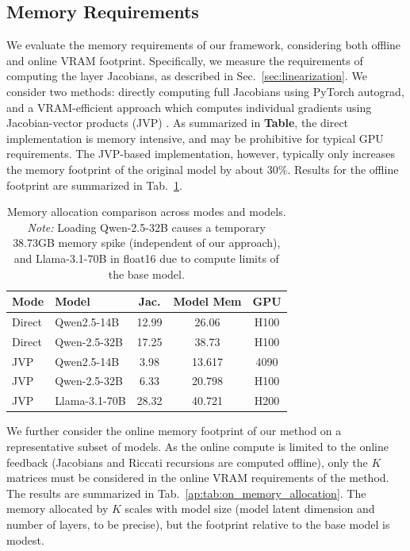 \documentclass{article}
\theoremstyle{plain}
\theoremstyle{definition}
\theoremstyle{remark}
\begin{document}
\FloatBarrier
\subsection{Memory Requirements}\label{ap:memory_reqs}
We evaluate the memory requirements of our framework, considering both offline and online VRAM footprint. Specifically, we measure the requirements of computing the layer Jacobians, as described in Sec.~\ref{sec:linearization}. We consider two methods: directly computing full Jacobians using PyTorch autograd, and a VRAM-efficient approach which computes individual gradients using Jacobian-vector products (JVP) \cite{paszke2019pytorch}. As summarized in \textbf{Table}, the direct implementation is memory intensive, and may be prohibitive for typical GPU requirements. The JVP-based implementation, however, typically only increases the memory footprint of the original model by about 30\%. Results for the offline footprint are summarized in Tab.~\ref{ap:tab:off_memory_allocation}.

\begin{table}[hbp]
\centering
\begin{threeparttable}
\caption{Memory allocation comparison across modes and models. \textit{Note:} Loading Qwen-2.5-32B causes a temporary 38.73GB memory spike (independent of our approach), and Llama-3.1-70B in float16 due to compute limits of the base model.}\label{ap:tab:off_memory_allocation}
\begin{tabular}{l|l|c|c|c}
\hline
\textbf{Mode} & \textbf{Model} & \textbf{Jac.} & \textbf{Model Mem} & \textbf{GPU} \\
\hline
Direct & Qwen2.5-14B & 12.99 & 26.06 & H100 \\
Direct & Qwen-2.5-32B & 17.25 & 38.73 & H100 \\
JVP & Qwen2.5-14B & 3.98 & 13.617 & 4090 \\
JVP & Qwen-2.5-32B & 6.33 & 20.798 & H100  \\
JVP & Llama-3.1-70B & 28.32 & 40.721 & H200  \\
\hline
\end{tabular}

\end{threeparttable}
\end{table}

We further consider the online memory footprint of our method on a representative subset of models. As the online compute is limited to the online feedback (Jacobians and Riccati recursions are computed offline), only the $K$ matrices must be considered in the online VRAM requirements of the method. The results are summarized in Tab.~\ref{ap:tab:on_memory_allocation}. The memory allocated by $K$ scales with model size (model latent dimension and number of layers, to be precise), but the footprint relative to the base model is modest. 
\end{document}
